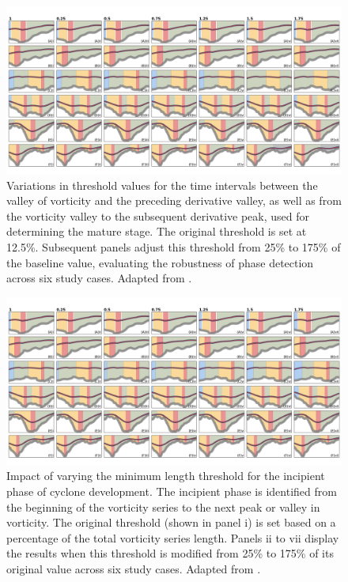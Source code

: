 \begin{figure}[h!]
    \centering
    \includegraphics[width=\textwidth]{figs_3/figure_threshold_mature_length.png}
    \caption[Variations in Threshold Values for Mature Phase]{Variations in threshold values for the time intervals between the valley of vorticity and the preceding derivative valley, as well as from the vorticity valley to the subsequent derivative peak, used for determining the mature stage. The original threshold is set at 12.5\%. Subsequent panels adjust this threshold from 25\% to 175\% of the baseline value, evaluating the robustness of phase detection across six study cases. Adapted from \citet{deSouza2024}.}
    \label{fig:threshold_mature}
\end{figure}

\begin{figure}[h!]
    \centering
    \includegraphics[width=\textwidth]{figs_3/figure_threshold_incipient_length.png}
    \caption[Impact of Varying Threshold Values for Incipient Phase]{Impact of varying the minimum length threshold for the incipient phase of cyclone development. The incipient phase is identified from the beginning of the vorticity series to the next peak or valley in vorticity. The original threshold (shown in panel i) is set based on a percentage of the total vorticity series length. Panels ii to vii display the results when this threshold is modified from 25\% to 175\% of its original value across six study cases. Adapted from \citet{deSouza2024}.}
    \label{fig:threshold_incipient}
\end{figure}

